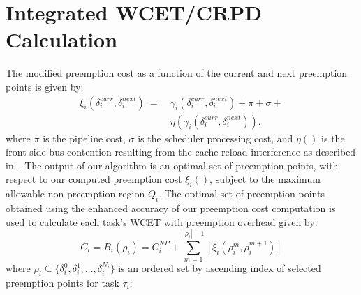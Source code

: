 \vspace{-10pt}
\section{Integrated WCET/CRPD Calculation}\label{sec:schedulability_analysis}

The modified preemption cost as a function of the current and next preemption points is given by:
\begin{equation}\label{eqn:prempt-cost}
\begin{split}
    \xi_{i}(\delta_{i}^{curr},\delta_{i}^{next})\ =\ &\gamma_{i}(\delta_{i}^{curr},\delta_{i}^{next}) + \pi + \sigma + \\ &\eta(\gamma_{i}(\delta_{i}^{curr},\delta_{i}^{next})).
\end{split}
\end{equation}
%
\noindent
where \begin{math}\pi\end{math} is the pipeline cost, \begin{math}\sigma\end{math} is the scheduler processing cost, and \begin{math}\eta()\end{math} is the front side bus contention resulting from the cache reload interference as described in~\cite{pellizzoni:07,pellizzoni:08,pellizzoni:11}.
%
The output of our algorithm is an optimal set of preemption points, with respect to our computed preemption cost $\xi_i()$, subject to the maximum allowable non-preemption region \begin{math}Q_{i}\end{math}.  The optimal set of preemption points obtained using the enhanced accuracy of our preemption cost computation is used to calculate each task's WCET with preemption overhead given by:
\begin{equation}\label{eqn:wcet-cost}
   C_{i} = B_{i}(\rho_{i}) = C_{i}^{NP} + \sum_{m=1}^{|\rho_{i}|-1} [\xi_{i}(\rho_{i}^{m},\rho_{i}^{m+1})]
\end{equation}
\noindent
where $\rho_i \subseteq \{\delta_i^0, \delta_i^1,  \ldots, \delta_i^{N_i}\}$ is an ordered set by ascending index of selected preemption points for task \begin{math}\tau_{i}\end{math}:
